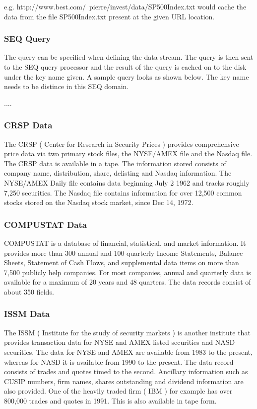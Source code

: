 e.g. http://www.best.com/~pierre/invest/data/SP500Index.txt would cache the data from the file SP500Index.txt present at the given URL location.

\subsubsection{SEQ Query}

The query can be specified when defining the data stream. The query is then sent to the SEQ query processor and the result of the query is cached on to the disk under the key name given. A sample query looks as shown below. The key name needs to be distince in this SEQ domain.

....


\subsubsection{CRSP Data}

The CRSP ( Center for Research in Security Prices ) provides comprehensive price data via two primary stock files, the NYSE/AMEX file and the Nasdaq file. The CRSP data is available in a tape. The information stored consists of company name, distribution, share, delisting and Nasdaq information. The NYSE/AMEX Daily file contains data beginning July 2 1962 and tracks roughly 7,250 securities. The Nasdaq file contains information for over 12,500 common stocks stored on the Nasdaq stock market, since Dec 14, 1972.                       


\subsubsection{COMPUSTAT Data}

COMPUSTAT is a database of financial, statistical, and market information. It provides more than 300 annual and 100 quarterly Income Statements, Balance Sheets, Statement of Cash Flows, and supplemental data items on more than 7,500 publicly help companies. For most companies, annual and quarterly data is available for a maximum of 20 years and 48 quarters. The data records consist of about 350 fields. 


\subsubsection{ISSM Data}

The ISSM ( Institute for the study of security markets ) is another institute that provides transaction data for NYSE and AMEX listed securities and NASD securities. The data for NYSE and AMEX are available from 1983 to the present, whereas for  NASD it is available from 1990 to the present. The data record consists of trades and quotes timed to the second. Ancillary information such as CUSIP numbers, firm names, shares outstanding and dividend information are also provided. One of the heavily traded firm ( IBM ) for example has over 800,000 trades and quotes in 1991. This is also available in tape form. 


